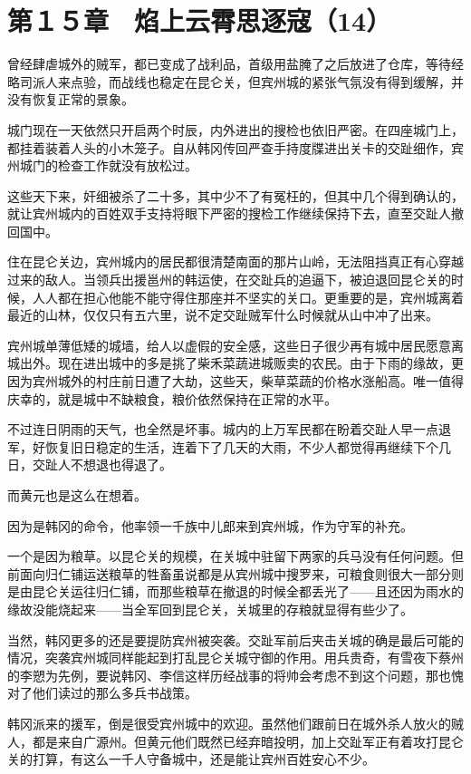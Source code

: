\section{第１５章　焰上云霄思逐寇（14）}

曾经肆虐城外的贼军，都已变成了战利品，首级用盐腌了之后放进了仓库，等待经略司派人来点验，而战线也稳定在昆仑关，但宾州城的紧张气氛没有得到缓解，并没有恢复正常的景象。

城门现在一天依然只开启两个时辰，内外进出的搜检也依旧严密。在四座城门上，都挂着装着人头的小木笼子。自从韩冈传回严查手持度牒进出关卡的交趾细作，宾州城门的检查工作就没有放松过。

这些天下来，奸细被杀了二十多，其中少不了有冤枉的，但其中几个得到确认的，就让宾州城内的百姓双手支持将眼下严密的搜检工作继续保持下去，直至交趾人撤回国中。

住在昆仑关边，宾州城内的居民都很清楚南面的那片山岭，无法阻挡真正有心穿越过来的敌人。当领兵出援邕州的韩运使，在交趾兵的追逼下，被迫退回昆仑关的时候，人人都在担心他能不能守得住那座并不坚实的关口。更重要的是，宾州城离着最近的山林，仅仅只有五六里，说不定交趾贼军什么时候就从山中冲了出来。

宾州城单薄低矮的城墙，给人以虚假的安全感，这些日子很少再有城中居民愿意离城出外。现在进出城中的多是挑了柴禾菜蔬进城贩卖的农民。由于下雨的缘故，更因为宾州城外的村庄前日遭了大劫，这些天，柴草菜蔬的价格水涨船高。唯一值得庆幸的，就是城中不缺粮食，粮价依然保持在正常的水平。

不过连日阴雨的天气，也全然是坏事。城内的上万军民都在盼着交趾人早一点退军，好恢复旧日稳定的生活，连着下了几天的大雨，不少人都觉得再继续下个几日，交趾人不想退也得退了。

而黄元也是这么在想着。

因为是韩冈的命令，他率领一千族中儿郎来到宾州城，作为守军的补充。

一个是因为粮草。以昆仑关的规模，在关城中驻留下两家的兵马没有任何问题。但前面向归仁铺运送粮草的牲畜虽说都是从宾州城中搜罗来，可粮食则很大一部分则是由昆仑关运往归仁铺，而那些粮草在撤退的时候全都丢光了——且还因为雨水的缘故没能烧起来——当全军回到昆仑关，关城里的存粮就显得有些少了。

当然，韩冈更多的还是要提防宾州被突袭。交趾军前后夹击关城的确是最后可能的情况，突袭宾州城同样能起到打乱昆仑关城守御的作用。用兵贵奇，有雪夜下蔡州的李愬为先例，要说韩冈、李信这样历经战事的将帅会考虑不到这个问题，那也愧对了他们读过的那么多兵书战策。

韩冈派来的援军，倒是很受宾州城中的欢迎。虽然他们跟前日在城外杀人放火的贼人，都是来自广源州。但黄元他们既然已经弃暗投明，加上交趾军正有着攻打昆仑关的打算，有这么一千人守备城中，还是能让宾州百姓安心不少。

